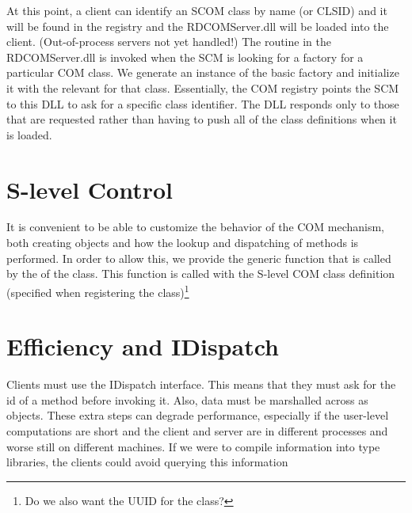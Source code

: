 \documentclass{article}
\begin{document}
At this point, a client can identify an SCOM class by name (or CLSID)
and it will be found in the registry and the RDCOMServer.dll will be
loaded into the client. (Out-of-process servers not yet handled!)  The
routine  in the RDCOMServer.dll is invoked
when the SCM is looking for a factory for a particular COM class.  We
generate an instance of the basic factory and initialize it with the
relevant  for that class.  Essentially, the COM
registry points the SCM to this DLL to ask for a specific class
identifier. The DLL responds only to those that are requested rather
than having to push all of the class definitions when it is loaded.


\section{S-level Control}
It is convenient to be able to customize the behavior of the COM
mechanism, both creating objects and how the lookup and dispatching of
methods is performed.  In order to allow this, we provide the generic
function  that is called by the
 of the  class.
This function is called with the S-level COM class definition
(specified when registering the class)\footnote{Do we also want the
UUID for the class?}



\section{Efficiency and IDispatch}
Clients must use the IDispatch interface.  This means that they must
ask for the id of a method before invoking it. Also, data must be
marshalled across as  objects.  These extra steps can
degrade performance, especially if the user-level computations are
short and the client and server are in different processes and worse
still on different machines.  If we were to compile information into
type libraries, the clients could avoid querying this information
\end{document}
